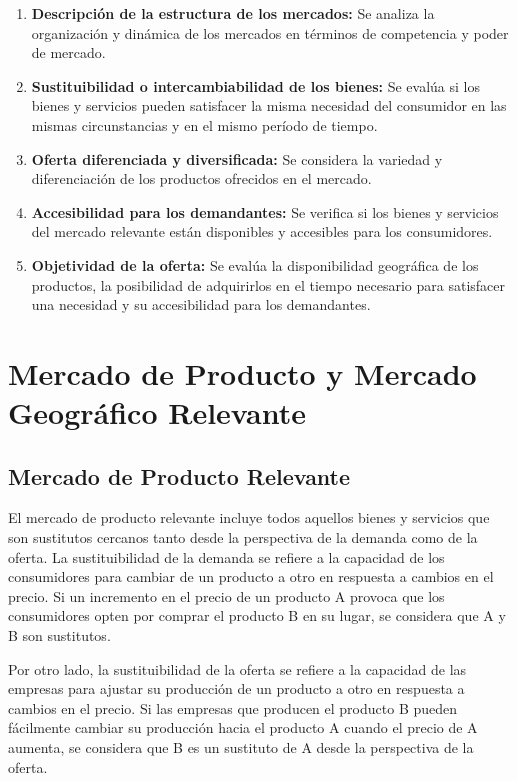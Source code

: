 \documentclass[
  doc,
  floatsintext,
  longtable,
  a4paper,
  nolmodern,
  notxfonts,
  notimes,
  12pt,
  colorlinks=true,linkcolor=blue,citecolor=blue,urlcolor=blue]{apa7}
\begin{document}
\begin{enumerate}
\def\labelenumi{\arabic{enumi}.}
\item
  \textbf{Descripción de la estructura de los mercados:} Se analiza la
  organización y dinámica de los mercados en términos de competencia y
  poder de mercado.
\item
  \textbf{Sustituibilidad o intercambiabilidad de los bienes:} Se evalúa
  si los bienes y servicios pueden satisfacer la misma necesidad del
  consumidor en las mismas circunstancias y en el mismo período de
  tiempo.
\item
  \textbf{Oferta diferenciada y diversificada:} Se considera la variedad
  y diferenciación de los productos ofrecidos en el mercado.
\item
  \textbf{Accesibilidad para los demandantes:} Se verifica si los bienes
  y servicios del mercado relevante están disponibles y accesibles para
  los consumidores.
\item
  \textbf{Objetividad de la oferta:} Se evalúa la disponibilidad
  geográfica de los productos, la posibilidad de adquirirlos en el
  tiempo necesario para satisfacer una necesidad y su accesibilidad para
  los demandantes.
\end{enumerate}

\section{Mercado de Producto y Mercado Geográfico
Relevante}\label{mercado-de-producto-y-mercado-geogruxe1fico-relevante}

\subsection{Mercado de Producto
Relevante}\label{mercado-de-producto-relevante}

El mercado de producto relevante incluye todos aquellos bienes y
servicios que son sustitutos cercanos tanto desde la perspectiva de la
demanda como de la oferta. La sustituibilidad de la demanda se refiere a
la capacidad de los consumidores para cambiar de un producto a otro en
respuesta a cambios en el precio. Si un incremento en el precio de un
producto A provoca que los consumidores opten por comprar el producto B
en su lugar, se considera que A y B son sustitutos.

Por otro lado, la sustituibilidad de la oferta se refiere a la capacidad
de las empresas para ajustar su producción de un producto a otro en
respuesta a cambios en el precio. Si las empresas que producen el
producto B pueden fácilmente cambiar su producción hacia el producto A
cuando el precio de A aumenta, se considera que B es un sustituto de A
desde la perspectiva de la oferta.
\end{document}
